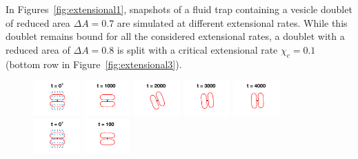 \documentclass[prf,superscriptaddress,showpacs]{revtex4-1}
\begin{document}
In Figures~\ref{fig:extensional1},
snapshots of a fluid trap containing a vesicle doublet of reduced area
$\Delta A = 0.7$ are simulated at different extensional rates.  While
this doublet remains bound for all the
considered extensional rates, a doublet with a reduced area of $\Delta A
= 0.8$ is split with a critical extensional rate $\chi_c =0.1$
(bottom row in Figure~\ref{fig:extensional3}).  
%
\begin{figure}[htp]
  \includegraphics[width = 0.16\textwidth,trim={4cm 2cm 4cm 1cm},clip]{figs/extensional_adR4em1adS7em1Chi2em2_ra070_image01.png}
  \includegraphics[width = 0.16\textwidth,trim={4cm 2cm 4cm 1cm},clip]{figs/extensional_adR4em1adS7em1Chi2em2_ra070_image02.png}
  \includegraphics[width = 0.16\textwidth,trim={4cm 2cm 4cm 1cm},clip]{figs/extensional_adR4em1adS7em1Chi2em2_ra070_image03.png}
  \includegraphics[width = 0.16\textwidth,trim={4cm 2cm 4cm 1cm},clip]{figs/extensional_adR4em1adS7em1Chi2em2_ra070_image04.png}
  \includegraphics[width = 0.16\textwidth,trim={4cm 2cm 4cm 1cm},clip]{figs/extensional_adR4em1adS7em1Chi2em2_ra070_image05.png}\\
   \includegraphics[width = 0.16\textwidth,trim={4cm 2cm 4cm 1cm},clip]{figs/extensional_adR4em1adS7em1Chi7em2_ra070_image01.png}
  \includegraphics[width = 0.16\textwidth,trim={4cm 2cm 4cm 1cm},clip]{figs/extensional_adR4em1adS7em1Chi7em2_ra070_image02.png}

\end{figure}
\end{document}
